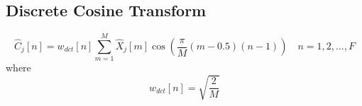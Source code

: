
\subsection{Discrete Cosine Transform}

\begin{equation}
\label{eq:dct}
\hat{C}_j[n] = w_{dct}[n] \sum^{M}_{m=1} \hat{X}_j[m] \cos \left( \frac{\pi}{M} (m - 0.5) (n-1) \right) \quad n = 1, 2, \dots, F
\end{equation}
where
\begin{equation}
\label{eq:dct-weight}
w_{dct}[n] = \sqrt{\frac{2}{M}}
\end{equation}

